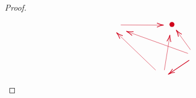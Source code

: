\begin{proof}
\begin{enumerate}
\[\begin{tikzpicture}[x=0.75pt,y=0.75pt,yscale=-1,xscale=1]
\draw [color={rgb, 255:red, 208; green, 2; blue, 27 }  ,draw opacity=1 ]   (351.11,208.11) -- (289.55,148.5) ;
\draw [shift={(288.11,147.11)}, rotate = 44.08] [color={rgb, 255:red, 208; green, 2; blue, 27 }  ,draw opacity=1 ][line width=0.75]    (10.93,-3.29) .. controls (6.95,-1.4) and (3.31,-0.3) .. (0,0) .. controls (3.31,0.3) and (6.95,1.4) .. (10.93,3.29)   ;
\draw  [color={rgb, 255:red, 208; green, 2; blue, 27 }  ,draw opacity=1 ][line width=6] [line join = round][line cap = round] (377.34,134.07) .. controls (377.34,134.07) and (377.34,134.07) .. (377.34,134.07) ;
\draw [color={rgb, 255:red, 208; green, 2; blue, 27 }  ,draw opacity=1 ][line width=0.75]    (405.11,192.11) -- (372.77,213.99) ;
\draw [shift={(371.11,215.11)}, rotate = 325.92] [color={rgb, 255:red, 208; green, 2; blue, 27 }  ,draw opacity=1 ][line width=0.75]    (10.93,-3.29) .. controls (6.95,-1.4) and (3.31,-0.3) .. (0,0) .. controls (3.31,0.3) and (6.95,1.4) .. (10.93,3.29)   ;
\draw [color={rgb, 255:red, 208; green, 2; blue, 27 }  ,draw opacity=1 ]   (295.1,134.83) -- (362.11,135.1) ;
\draw [shift={(364.11,135.11)}, rotate = 180.23] [color={rgb, 255:red, 208; green, 2; blue, 27 }  ,draw opacity=1 ][line width=0.75]    (10.93,-3.29) .. controls (6.95,-1.4) and (3.31,-0.3) .. (0,0) .. controls (3.31,0.3) and (6.95,1.4) .. (10.93,3.29)   ;
\draw [color={rgb, 255:red, 208; green, 2; blue, 27 }  ,draw opacity=1 ]   (365.11,208.11) -- (373.8,153.09) ;
\draw [shift={(374.11,151.11)}, rotate = 98.97] [color={rgb, 255:red, 208; green, 2; blue, 27 }  ,draw opacity=1 ][line width=0.75]    (10.93,-3.29) .. controls (6.95,-1.4) and (3.31,-0.3) .. (0,0) .. controls (3.31,0.3) and (6.95,1.4) .. (10.93,3.29)   ;
\draw [color={rgb, 255:red, 208; green, 2; blue, 27 }  ,draw opacity=1 ]   (403.11,181.11) -- (305.99,145.79) ;
\draw [shift={(304.11,145.11)}, rotate = 19.98] [color={rgb, 255:red, 208; green, 2; blue, 27 }  ,draw opacity=1 ][line width=0.75]    (10.93,-3.29) .. controls (6.95,-1.4) and (3.31,-0.3) .. (0,0) .. controls (3.31,0.3) and (6.95,1.4) .. (10.93,3.29)   ;
\draw [color={rgb, 255:red, 208; green, 2; blue, 27 }  ,draw opacity=1 ]   (407.11,175.11) -- (385.28,144.74) ;
\draw [shift={(384.11,143.11)}, rotate = 54.29] [color={rgb, 255:red, 208; green, 2; blue, 27 }  ,draw opacity=1 ][line width=0.75]    (10.93,-3.29) .. controls (6.95,-1.4) and (3.31,-0.3) .. (0,0) .. controls (3.31,0.3) and (6.95,1.4) .. (10.93,3.29)   ;

\end{tikzpicture}\]
\end{enumerate}
\end{proof}
